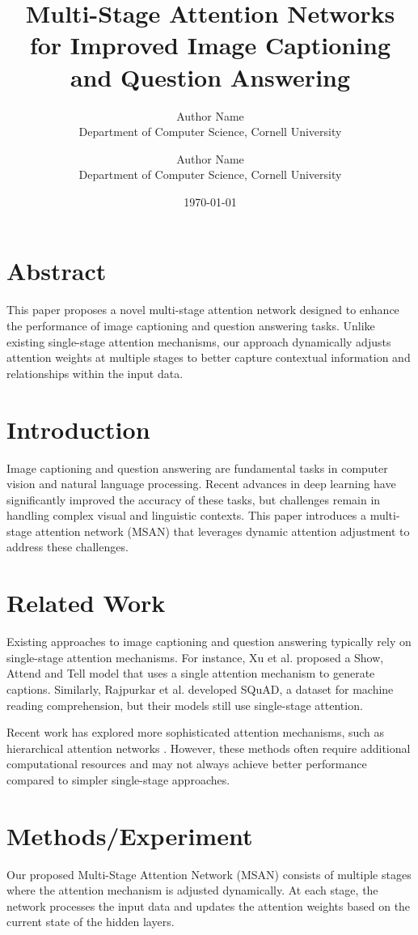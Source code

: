 \documentclass{article}
\title{Multi-Stage Attention Networks for Improved Image Captioning and Question Answering}
\author{Author Name \\
Department of Computer Science, Cornell University \\
\and
Author Name \\
Department of Computer Science, Cornell University}
\date{\today}
\begin{document}
\maketitle

\section{Abstract}
This paper proposes a novel multi-stage attention network designed to enhance the performance of image captioning and question answering tasks. Unlike existing single-stage attention mechanisms, our approach dynamically adjusts attention weights at multiple stages to better capture contextual information and relationships within the input data.

\section{Introduction}
Image captioning and question answering are fundamental tasks in computer vision and natural language processing. Recent advances in deep learning have significantly improved the accuracy of these tasks, but challenges remain in handling complex visual and linguistic contexts. This paper introduces a multi-stage attention network (MSAN) that leverages dynamic attention adjustment to address these challenges.

\section{Related Work}
\label{sec:related_work}
Existing approaches to image captioning and question answering typically rely on single-stage attention mechanisms. For instance, Xu et al. \cite{xu2015show} proposed a Show, Attend and Tell model that uses a single attention mechanism to generate captions. Similarly, Rajpurkar et al. \cite{rajpurkar2016squad} developed SQuAD, a dataset for machine reading comprehension, but their models still use single-stage attention.

Recent work has explored more sophisticated attention mechanisms, such as hierarchical attention networks \cite{zheng2018hierarchical}. However, these methods often require additional computational resources and may not always achieve better performance compared to simpler single-stage approaches.

\section{Methods/Experiment}
\label{sec:methods}
Our proposed Multi-Stage Attention Network (MSAN) consists of multiple stages where the attention mechanism is adjusted dynamically. At each stage, the network processes the input data and updates the attention weights based on the current state of the hidden layers.
\end{document}
